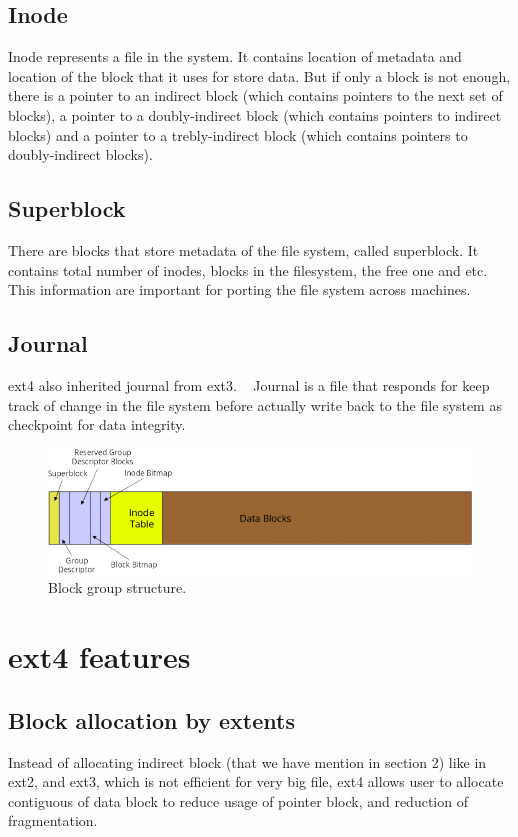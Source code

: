 \documentclass[11pt,a4paper]{article}
\begin{document}
\subsection{Inode}
Inode represents a file in the system. It contains location of metadata and location of the block that it uses for store data. But if only a block is not enough, there is a pointer to an indirect block (which contains pointers to the next set of blocks), a pointer to a doubly-indirect block (which contains pointers to indirect blocks) and a pointer to a trebly-indirect block (which contains pointers to doubly-indirect blocks). ~\cite{KernalDoc:Ext2}

\subsection{Superblock}
There are blocks that store metadata of the file system, called superblock. It contains total number of inodes, blocks in the filesystem, the free one and etc. This information are important for porting the file system across machines. ~\cite{KernalDoc:Ext2} 


\subsection{Journal}
ext4 also inherited journal from ext3. ~\cite{wiki:Ext4} Journal is a file that responds for keep track of change in the file system before actually write back to the file system as checkpoint for data integrity. ~\cite{wiki:Journaling_file_system}

\begin{figure}[h]
\includegraphics[width=\textwidth]{cylindergroup-01_1.png}
\caption{Block group structure.~\cite{opensource:intro_to_ext4fs}}
\end{figure}

\section{ext4 features}

\subsection{Block allocation by extents}
Instead of allocating indirect block (that we have mention in section 2) like in ext2, and ext3, which is not efficient for very big file, ext4 allows user to allocate contiguous of data block to reduce usage of pointer block, and reduction of fragmentation. ~\cite{opensource:intro_to_ext4fs}
\end{document}
